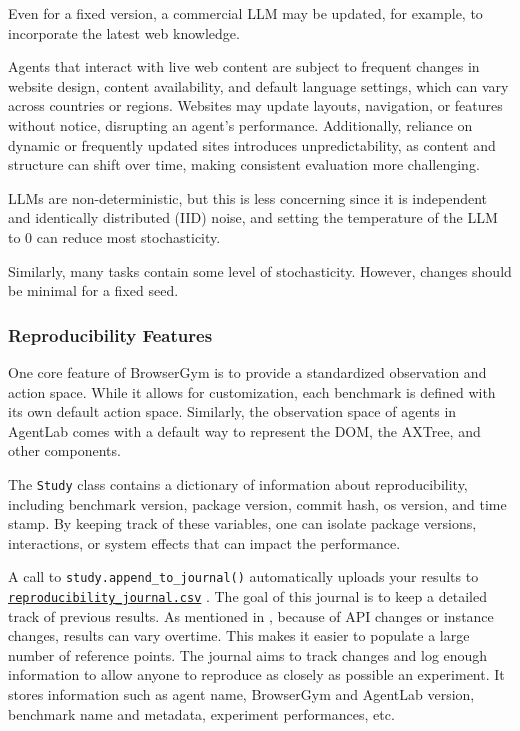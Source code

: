 \documentclass[10pt]{article} %
\newcommand{\code}[1]{\texttt{#1}}
\begin{document}
 Even for a fixed version, a commercial LLM may be updated, for example, to incorporate the latest web knowledge. 

Agents that interact with live web content are subject to frequent changes in website design, content availability, and default language settings, which can vary across countries or regions. Websites may update layouts, navigation, or features without notice, disrupting an agent’s performance. Additionally, reliance on dynamic or frequently updated sites introduces unpredictability, as content and structure can shift over time, making consistent evaluation more challenging.

 LLMs are non-deterministic, but this is less concerning since it is independent and identically distributed (IID) noise, and setting the temperature of the LLM to 0 can reduce most stochasticity.

Similarly, many tasks contain some level of stochasticity. However, changes should be minimal for a fixed seed.

\subsubsection{Reproducibility Features}

 One core feature of BrowserGym is to provide a standardized observation and action space. While it allows for customization, each benchmark is defined with its own default action space. Similarly, the observation space of agents in AgentLab comes with a default way to represent the DOM, the AXTree, and other components.

 The \code{Study} class contains a dictionary of information about reproducibility, including benchmark version, package version, commit hash, os version, and time stamp. By keeping track of these variables, one can isolate package versions, interactions, or system effects that can impact the performance.

 A call to \code{study.append_to_journal()} automatically uploads your results to \href{https://github.com/ServiceNow/AgentLab/blob/main/reproducibility_journal.csv}{\code{reproducibility_journal.csv}}%
. The goal of this journal is to keep a detailed track of previous results. As mentioned in , because of API changes or instance changes, results can vary overtime.
This makes it easier to populate a large number of reference points. The journal aims to track changes and log enough information to allow anyone to reproduce as closely as possible an experiment. It stores information such as agent name, BrowserGym and AgentLab version, benchmark name and metadata, experiment performances, etc.
\end{document}
